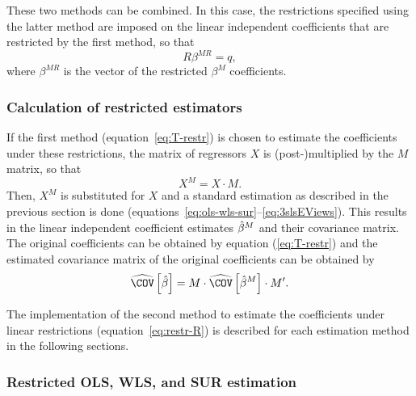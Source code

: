 These two methods can be combined.
In this case, the restrictions specified using the latter method are
imposed on the linear independent coefficients
that are restricted by the first method, so that
\begin{equation}
   R \beta^{MR} = q ,
\end{equation}
where $\beta^{MR}$ is the vector of the restricted $\beta^M$ coefficients.


\subsubsection{Calculation of restricted estimators}

If the first method (equation~\ref{eq:T-restr}) is chosen
to estimate the coefficients under these restrictions,
the matrix of regressors $X$ is (post-)\hspace{0pt}multiplied
by the $M$ matrix,
so that
\begin{equation}
    X^M = X \cdot M .
\end{equation}
Then, $X^M$ is substituted for $X$ and a standard estimation as described
in the previous section is done
(equations~\ref{eq:ols-wls-sur}--\ref{eq:3slsEViews}).
This results in the linear independent coefficient estimates $\hat{\beta}^M$ and
their covariance matrix.
The original coefficients can be obtained by equation (\ref{eq:T-restr})
and the estimated covariance matrix of the original coefficients
can be obtained by
\begin{equation}
   \COVHat \left[ \bHat \right]
   = M \cdot \COVHat \left[ \bHat^M \right] \cdot M' .
\end{equation}

The implementation of the second method to estimate the coefficients
under linear restrictions (equation~\ref{eq:restr-R})
is described for each estimation method in the following sections.


\subsubsection{Restricted OLS, WLS, and SUR estimation}

